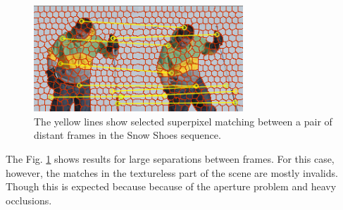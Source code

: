    \begin{figure}[thpb]
      \centering
      \includegraphics[width=0.70\textwidth]{../images/matches_snowshoes.png}
      \caption{The yellow lines show selected superpixel
		matching between a pair of distant frames in the Snow Shoes sequence.}
      \label{figurelabel_matchessnow}
   \end{figure}   
	\setlength{\belowcaptionskip}{-10pt}
 
The Fig. \ref{figurelabel_matchessnow} shows
 results for large separations between frames. %
For this case, however, the matches in the textureless part of the scene
 are mostly invalids. Though this is expected because because of the aperture problem and
 heavy occlusions.
